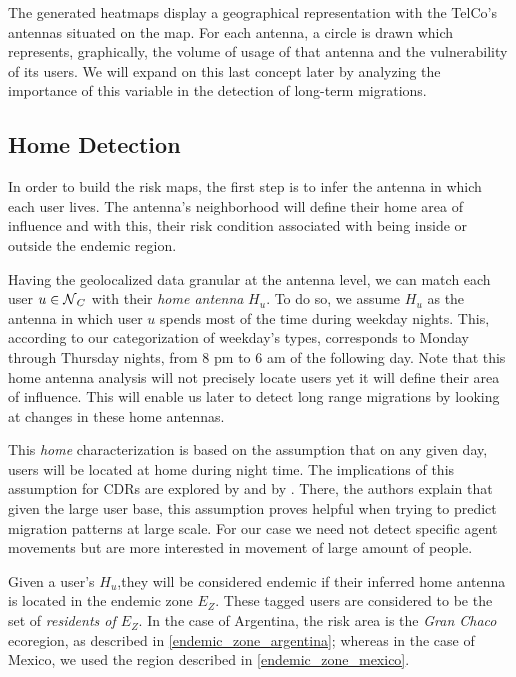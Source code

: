 The generated heatmaps display a geographical representation with the TelCo's antennas situated on the map.
For each antenna, a circle is drawn which represents, graphically, the volume of usage of that antenna and the vulnerability of its users.
We will expand on this last concept later by analyzing the importance of this variable in the detection of long-term migrations.

\subsection{Home Detection}\label{subsection:home_detection}

In order to build the risk maps, the first step is to infer the antenna in which each user lives.
The antenna's neighborhood will define their home area of influence and with this, their risk condition associated with being inside or outside the endemic region.

Having the geolocalized data granular at the antenna level, we can match each user $u \in \operatorname{\mathcal{N}}_C$ with their \textit{home antenna} $H_u$.
To do so, we assume $H_u$ as the antenna in which user $u$ spends most of the time during weekday nights.
This, according to our categorization of weekday's types, corresponds to Monday through Thursday nights, from 8 pm to 6 am of the following day.
Note that this home antenna analysis will not precisely locate users yet it will define their area of influence.
This will enable us later to detect long range migrations by looking at changes in these home antennas.

This \textit{home} characterization is based on the assumption that on any given day, users will be located at home during night time.
The implications of this assumption for CDRs are explored by \citep{sarraute2015socialevents} and by \citep{csaji2012exploring}.
There, the authors explain that given the large user base, this assumption proves helpful when trying to predict migration patterns at large scale.
For our case we need not detect specific agent movements but are more interested in movement of large amount of people.

Given a user's $H_u$,they will be considered endemic if their inferred home antenna is located in the endemic zone $E_Z$.
These tagged users are considered to be the set of \textit{residents of $E_Z$}.
In the case of Argentina, the risk area is the \textit{Gran Chaco} ecoregion, as described in \cref{endemic_zone_argentina};
whereas in the case of Mexico, we used the region described in \cref{endemic_zone_mexico}.



